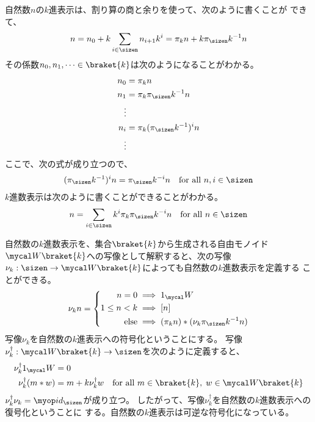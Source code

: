 	自然数$n$の$k$進表示は、割り算の商と余りを使って、次のように書くことが
	できて、
	\begin{equation*}\begin{split}
		n = n_0 + k\sum_{i\in\sizen}n_{i+1}k^i = \pi_kn + k\pi_\sizen k^{-1}n
	\end{split}\end{equation*}
	その係数$n_0,n_1,\dots\in\braket{k}$は次のようになることがわかる。
	\begin{equation*}\begin{split}
		n_0 &= \pi_kn \\
		n_1 &= \pi_k\pi_\sizen k^{-1}n \\
		\vdots \\
		n_i &= \pi_k(\pi_\sizen k^{-1})^in \\
		\vdots \\
	\end{split}\end{equation*}
	ここで、次の式が成り立つので、
	\begin{equation*}\begin{split}
		(\pi_\sizen k^{-1})^in = \pi_\sizen k^{-i}n
		\quad\text{for all }n,i\in\sizen
	\end{split}\end{equation*}
	$k$進数表示は次のように書くことができることがわかる。
	\begin{equation}\label{eq:自然数のk進表示その二}\begin{split}
		n = \sum_{i\in\sizen}k^i\pi_k\pi_\sizen k^{-i}n 
		\quad\text{for all }n\in\sizen
	\end{split}\end{equation}

	自然数の$k$進数表示を、集合$\braket{k}$から生成される自由モノイド
	$\Word\braket{k}$への写像として解釈すると、次の写像
	$\nu_k:\sizen\to\Word\braket{k}$によっても自然数の$k$進数表示を定義する
	ことができる。
	\begin{equation}\label{eq:自然数のk進表示符号化}\begin{split}
		\nu_k n = \left\{\begin{split}
			n = 0 &\implies 1_\Word \\
			1\le n < k &\implies [n] \\
			\text{else} &\implies (\pi_kn) * (\nu_k\pi_\sizen k^{-1}n) \\
		\end{split}\right. \\ %
	\end{split}\end{equation}
	写像$\nu_k$を自然数の$k$進表示への符号化ということにする。
	写像$\nu_k^\dag:\Word\braket{k}\to\sizen$を次のように定義すると、
	\begin{equation}\label{eq:自然数のk進表示復号化}\begin{split}
		\nu_k^\dag1_\Word &= 0 \\
		\nu_k^\dag(m*w) &= m + k\nu_k^\dag w
		\quad\text{for all }m\in\braket{k},\;w\in \Word\braket{k}
	\end{split}\end{equation}
	$\nu_k^\dag\nu_k=\id_{\sizen}$が成り立つ。
	したがって、写像$\nu_k^\dag$を自然数の$k$進数表示への復号化ということに
	する。自然数の$k$進表示は可逆な符号化になっている。

